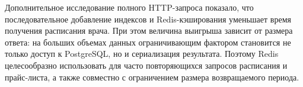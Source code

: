 Дополнительное исследование полного HTTP-запроса показало, что последовательное добавление индексов и Redis-кэширования уменьшает время получения расписания врача. При этом величина выигрыша зависит от размера ответа: на больших объемах данных ограничивающим фактором становится не только доступ к PostgreSQL, но и сериализация результата. Поэтому Redis целесообразно использовать для часто повторяющихся запросов расписания и прайс-листа, а также совместно с ограничением размера возвращаемого периода.

\clearpage
